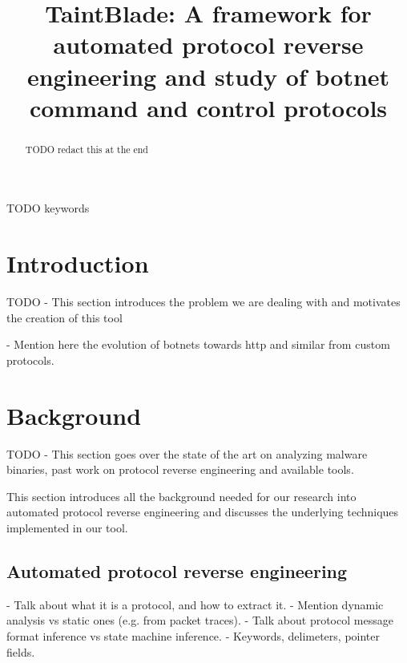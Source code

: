 \documentclass[conference]{IEEEtran}
\begin{document}
\title{TaintBlade: A framework for automated protocol reverse engineering and study of botnet command and control protocols
}

\author{
    \and
}

\maketitle

\begin{abstract}
    TODO redact this at the end
\end{abstract}

\begin{IEEEkeywords}
    TODO keywords
\end{IEEEkeywords}

\section{Introduction}
TODO - This section introduces the problem we are dealing with and motivates
the creation of this tool

- Mention here the evolution of botnets towards http and similar from custom protocols.

\section{Background}
TODO - This section goes over the state of the art on analyzing malware
binaries, past work on protocol reverse engineering and available tools.

This section introduces all the background needed for our research into automated protocol reverse engineering and 
discusses the underlying techniques implemented in our tool.


\subsection{Automated protocol reverse engineering}
- Talk about what it is a protocol, and how to extract it.
- Mention dynamic analysis vs static ones (e.g. from packet traces).
- Talk about protocol message format inference vs state machine inference.
- Keywords, delimeters, pointer fields.
\end{document}
